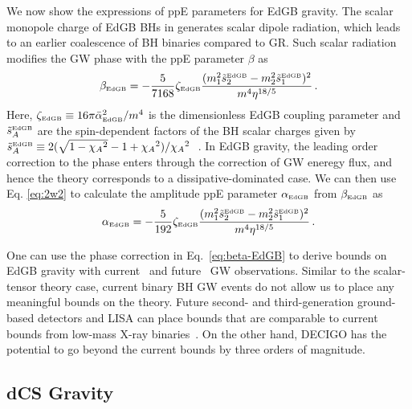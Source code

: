 \documentclass[prd,twocolumn,nofootinbib]{revtex4-1}
\newcommand{\EDGB}{{\mbox{\tiny EdGB}}}
\begin{document}
We now show the expressions of ppE parameters for EdGB gravity. The scalar monopole charge of EdGB BHs in  generates scalar dipole radiation, which leads to an earlier coalescence of BH binaries compared to GR. Such scalar radiation modifies the GW phase with the ppE parameter $\beta$ as~\cite{Yunes:2016jcc,Yagi:2011xp}
\begin{equation}
\label{eq:beta-EdGB}
 \beta_\EDGB=-\frac{5}{7168}\zeta_\EDGB\frac{(m_1^2\tilde s_2^\EDGB-m_2^2\tilde s_1^\EDGB)^2}{m^4\eta^{18/5}}\,.
 \end{equation}
 Here, $\zeta_\EDGB\equiv 16 \pi \bar{\alpha}_\EDGB^2/m^4$ is the dimensionless EdGB coupling parameter and $\tilde s_{A}^\EDGB$ are the spin-dependent factors of the BH scalar charges given by $\tilde s_{A}^\EDGB\equiv 2(\sqrt{1-{\chi_A}^2}-1+{\chi_A}^2)/{\chi_A}^2~$ \cite{Berti:2018cxi,Prabhu:2018aun}. In EdGB gravity, the leading order correction to the phase enters through the correction of GW eneregy flux, and hence the theory corresponds to a dissipative-dominated case. We can then use Eq. \eqref{eq:2w2} to calculate the amplitude ppE parameter $\alpha_\EDGB$ from $\beta_\EDGB$ as  
 \begin{equation}
 \alpha_\EDGB=-\frac{5}{192}\zeta_\EDGB\frac{(m_1^2 \tilde s_2^\EDGB-m_2^2 \tilde s_1^\EDGB)^2}{m^4\eta^{18/5}}\,.
 \end{equation}
 
 One can use the phase correction in Eq.~\eqref{eq:beta-EdGB} to derive bounds on EdGB gravity with current~\cite{Yunes:2016jcc} and future~\cite{Yagi:2012gp} GW observations. Similar to the scalar-tensor theory case, current binary BH GW events do not allow us to place any meaningful bounds on the theory. Future second- and third-generation ground-based detectors and LISA can place bounds that are comparable to current bounds from low-mass X-ray binaries~\cite{Yagi:2012gp}. On the other hand, DECIGO has the potential to go beyond the current bounds by three orders of magnitude.
 
  \subsection{dCS Gravity}
  
\end{document}
